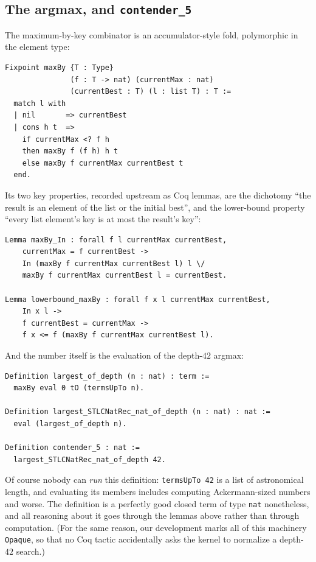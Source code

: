 \documentclass[11pt,a4paper]{article}
\theoremstyle{plain}
\theoremstyle{definition}
\theoremstyle{remark}
\begin{document}
\subsection{The argmax, and \texttt{contender\_5}}

The maximum-by-key combinator is an accumulator-style fold,
polymorphic in the element type:

\begin{lstlisting}
Fixpoint maxBy {T : Type}
               (f : T -> nat) (currentMax : nat)
               (currentBest : T) (l : list T) : T :=
  match l with
  | nil       => currentBest
  | cons h t  =>
    if currentMax <? f h
    then maxBy f (f h) h t
    else maxBy f currentMax currentBest t
  end.
\end{lstlisting}

Its two key properties, recorded upstream as Coq lemmas, are the
dichotomy ``the result is an element of the list or the initial
best'', and the lower-bound property ``every list element's key is at
most the result's key'':

\begin{lstlisting}
Lemma maxBy_In : forall f l currentMax currentBest,
    currentMax = f currentBest ->
    In (maxBy f currentMax currentBest l) l \/
    maxBy f currentMax currentBest l = currentBest.

Lemma lowerbound_maxBy : forall f x l currentMax currentBest,
    In x l ->
    f currentBest = currentMax ->
    f x <= f (maxBy f currentMax currentBest l).
\end{lstlisting}

And the number itself is the evaluation of the depth-$42$ argmax:

\begin{lstlisting}
Definition largest_of_depth (n : nat) : term :=
  maxBy eval 0 tO (termsUpTo n).

Definition largest_STLCNatRec_nat_of_depth (n : nat) : nat :=
  eval (largest_of_depth n).

Definition contender_5 : nat :=
  largest_STLCNatRec_nat_of_depth 42.
\end{lstlisting}

Of course nobody can \emph{run} this definition: \texttt{termsUpTo 42}
is a list of astronomical length, and evaluating its members includes
computing Ackermann-sized numbers and worse.  The definition is a
perfectly good closed term of type \texttt{nat} nonetheless, and all
reasoning about it goes through the lemmas above rather than through
computation.  (For the same reason, our development marks all of this
machinery \texttt{Opaque}, so that no Coq tactic accidentally asks the
kernel to normalize a depth-$42$ search.)
\end{document}
